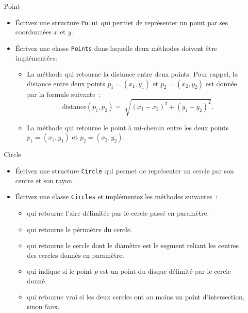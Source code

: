 \documentclass[a4paper,11pt]{style-esi/td}
\begin{document}
	\begin{Exercice}{Point}
		\begin{itemize}
			\item
				Écrivez une structure \texttt{Point} qui permet de représenter un point par ses coordonnées $x$ et $y$.
			\item 
				Écrivez une classe \texttt{Points} dans laquelle deux méthodes doivent être implémentées:
				\begin{itemize}
					\item 
						La méthode  qui retourne la distance entre deux points. Pour rappel, la distance entre deux points $p_1 = (x_1, y_1)$ et $p_2 = (x_2, y_2)$ est donnée par la formule suivante~:
						\[
							\textrm{distance}(p_1, p_2) = \sqrt[]{(x_1 - x_2)^2 + (y_1 - y_2)^2}.
						\]
					\item 
						La méthode  qui retourne le point à mi-chemin entre les deux points $p_1 = (x_1, y_1)$ et $p_2 = (x_2, y_2)$.
				\end{itemize}
		\end{itemize}		
	\end{Exercice}

	\begin{Exercice}{Circle}
		\begin{itemize}
			\item
				Écrivez une structure \texttt{Circle} qui permet de représenter un cercle par son centre et son rayon.
			\item
				Écrivez une classe \texttt{Circles} et implémentez les méthodes suivantes~:
				\begin{itemize}
					\item 
						 qui retourne l'aire délimitée par le cercle passé en paramètre.
					\item
						 qui retourne le périmètre du cercle.
					\item  
						 qui retourne le cercle dont le diamètre est le segment reliant les centres des cercles donnés en paramètre.
					\item  
						 qui indique si le point $p$ est un point du disque délimité par le cercle donné.
					\item  
						 qui retourne vrai si les deux cercles ont au moins un point d'intersection, sinon faux.
				\end{itemize}
		\end{itemize}		
	\end{Exercice}
\end{document}

